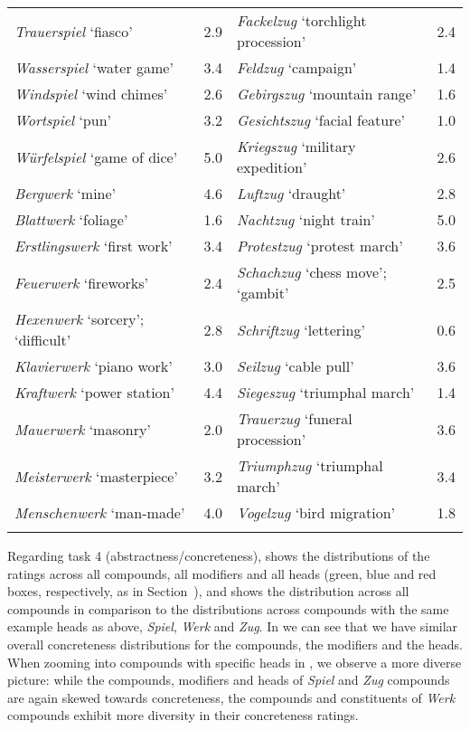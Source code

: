 \documentclass[output=paper,colorlinks,citecolor=brown]{langscibook}
\begin{document}
\begin{table}
{\begin{tabular}{ *2{lc} }
\textit{Trauerspiel} `fiasco'                  & 2.9 &  \textit{Fackelzug} `torchlight procession' & 2.4\\
\textit{Wasserspiel} `water game'              & 3.4 &  \textit{Feldzug} `campaign' & 1.4\\               
\textit{Windspiel} `wind chimes'               & 2.6 &  \textit{Gebirgszug} `mountain range' & 1.6\\      
\textit{Wortspiel} `pun'                       & 3.2 &  \textit{Gesichtszug} `facial feature' & 1.0\\     
\textit{Würfelspiel} `game of dice'            & 5.0 &  \textit{Kriegszug} `military expedition' & 2.6\\  
\textit{Bergwerk} `mine'                       & 4.6 &  \textit{Luftzug} `draught' & 2.8\\ 
\textit{Blattwerk} `foliage'                   & 1.6 &  \textit{Nachtzug} `night train' & 5.0\\ 
\textit{Erstlingswerk} `first work'            & 3.4 &  \textit{Protestzug} `protest march' & 3.6 \\ 
\textit{Feuerwerk} `fireworks'                 & 2.4 &  \textit{Schachzug} `chess move'; `gambit' & 2.5 \\ 
\textit{Hexenwerk} `sorcery'; `difficult'      & 2.8 &  \textit{Schriftzug} `lettering' & 0.6\\ 
\textit{Klavierwerk} `piano work'              & 3.0 &  \textit{Seilzug} `cable pull' & 3.6\\ 
\textit{Kraftwerk} `power station'             & 4.4 &  \textit{Siegeszug} `triumphal march' & 1.4 \\ 
\textit{Mauerwerk} `masonry'                   & 2.0 &  \textit{Trauerzug} `funeral procession' & 3.6\\ 
\textit{Meisterwerk} `masterpiece'             & 3.2 &  \textit{Triumphzug} `triumphal march' & 3.4\\ 
\textit{Menschenwerk} `man-made'               & 4.0 &  \textit{Vogelzug} `bird migration' & 1.8\\ 
\lspbottomrule
\end{tabular}}
\end{table}

Regarding task 4 (abstractness/concreteness),  shows the distributions of the ratings across all compounds, all modifiers and all heads (green, blue and red boxes, respectively, as in Section~), and  shows the distribution across all compounds in comparison to the distributions across compounds with the same example heads as above, \textit{Spiel}, \textit{Werk} and \textit{Zug}. In  we can see that we have similar overall concreteness distributions for the compounds, the modifiers and the heads. When zooming into compounds with specific heads in , we observe a more diverse picture: while the compounds, modifiers and heads of \textit{Spiel} and \textit{Zug} compounds are again skewed towards concreteness, the compounds and constituents of \textit{Werk} compounds exhibit more diversity in their concreteness ratings.
\end{document}
